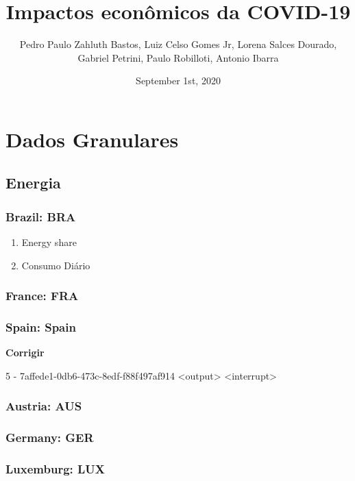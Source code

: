 \documentclass[11pt]{article}
\author{Pedro Paulo Zahluth Bastos, Luiz Celso Gomes Jr, Lorena Salces Dourado, Gabriel Petrini, Paulo Robilloti, Antonio Ibarra}
\date{September 1st, 2020}
\title{Impactos econômicos da COVID-19}
\begin{document}
\maketitle
\tableofcontents


\section{Dados Granulares}
\label{sec:org354cc98}

\subsection{Energia}
\label{sec:org4359178}



\subsubsection{Brazil: BRA}
\label{sec:orga4a25ae}
\begin{enumerate}
\item Energy share
\label{sec:org7bc6b5b}

\item Consumo Diário
\label{sec:orge711479}
\end{enumerate}




\subsubsection{France: FRA}
\label{sec:orgd7f502d}

\subsubsection{Spain: Spain}
\label{sec:orgb88a293}

\textbf{Corrigir}

5 - 7affede1-0db6-473c-8edf-f88f497af914 <output> <interrupt>

\subsubsection{Austria: AUS}
\label{sec:org7b291e3}

\subsubsection{Germany: GER}
\label{sec:org89110dc}

\subsubsection{Luxemburg: LUX}
\label{sec:orgbc9d702}
\end{document}
